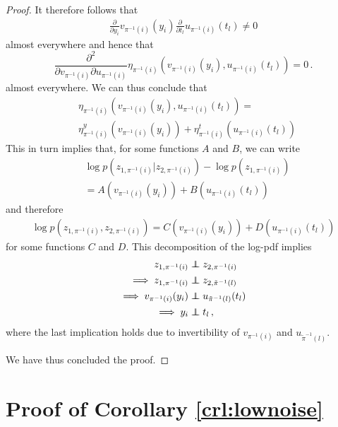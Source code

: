 \begin{proof}
It therefore follows that
\begin{align*}
    \frac{\partial}{\partial y_i}v_{\pi^{-1}(i)}(y_i) \frac{\partial }{\partial t_l} u_{\pi^{-1}(i)}(t_l) \neq 0
\end{align*}
almost everywhere and hence that
\begin{equation}
\frac{\partial^2}{\partial v_{\pi^{-1}(i)} \partial u_{\pi^{-1}(i)}} \eta_{\pi^{-1}(i)}(v_{\pi^{-1}(i)}(y_i), u_{\pi^{-1}(i)}(t_l)) = 0\,. \label{eq:additive_eta}
\end{equation}
almost everywhere.
We can thus conclude that
\begin{align*}
&\eta_{\pi^{-1}(i)}(v_{\pi^{-1}(i)}(y_i), u_{\pi^{-1}(i)}(t_l)) = \\ &\eta_{\pi^{-1}(i)}^y(v_{\pi^{-1}(i)}(y_i))+ \eta_{\pi^{-1}(i)}^t(u_{\pi^{-1}(i)}(t_l))
\end{align*}
This in turn implies that, for some functions $A$ and $B$, we can write
\begin{align*}
    &\log p(z_{1, \pi^{-1}(i)}|z_{2, \pi^{-1}(i)}) - \log p(z_{1, \pi^{-1}(i)}) \\ &= A(v_{\pi^{-1}(i)}(y_i)) + B(u_{\pi^{-1}(i)}(t_l))
\end{align*}
and therefore
\begin{align*}
    \log p(z_{1, \pi^{-1}(i)},z_{2, \pi^{-1}(i)}) = C(v_{\pi^{-1}(i)}(y_i)) + D(u_{\pi^{-1}(i)}(t_l))
\end{align*}
for some functions $C$ and $D$. This decomposition of the log-pdf implies
\begin{align*}
z_{1, \pi^{-1}(i)} &\independent z_{2, \pi^{-1}(i)}\\
\implies z_{1, \pi^{-1}(i)} &\independent z_{2, \tilde{\pi}^{-1}(l)}  \\
\implies v_{\pi^{-1}(i)}(y_i)  &\independent u_{\tilde{\pi}^{-1}(l)}(t_l) \\
\implies y_i  &\independent t_l \,,
\end{align*}
where the last implication holds due to invertibility of $v_{\pi^{-1}(i)}$ and $u_{\tilde{\pi}^{-1}(l)}$.

We have thus concluded the proof.

\end{proof}

\section{Proof of Corollary \ref{crl:lownoise}}
\label{appendix:thm2}

